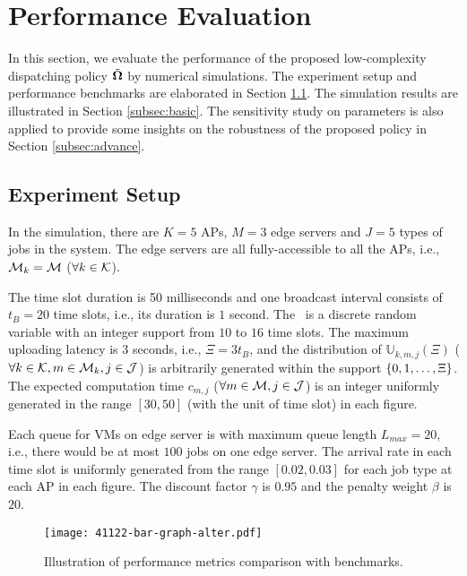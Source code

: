 \section{Performance Evaluation}
\label{sec:evaluation}
In this section, we evaluate the performance of the proposed low-complexity dispatching policy $\tilde{\boldsymbol{\Omega}}$ by numerical simulations.
The experiment setup and performance benchmarks are elaborated in Section \ref{subsec:setup}.
The simulation results are illustrated in Section \ref{subsec:basic}.
The sensitivity study on parameters is also applied to provide some insights on the robustness of the proposed policy in Section \ref{subsec:advance}.

\subsection{Experiment Setup}
\label{subsec:setup}
In the simulation, there are $K=5$ APs, $M=3$ edge servers and $J=5$ types of jobs in the system.
The edge servers are all fully-accessible to all the APs, i.e., $\mathcal{M}_{k}=\mathcal{M}$ ($\forall k\in\mathcal{K}$).

The time slot duration is 50 milliseconds and one broadcast interval consists of $t_{B}=20$ time slots, i.e., its duration is $1$ second.
The \brlatency~is a discrete random variable with an integer support from $10$ to $16$ time slots.
The maximum uploading latency is $3$ seconds, i.e., $\Xi = 3t_B$, and the distribution of $\mathbb{U}_{k,m,j}(\Xi)$ ($\forall k\in\mathcal{K}, m\in\mathcal{M}_{k}, j\in\mathcal{J}$) is arbitrarily generated within the support $\{0, 1, \dots, \Xi\}$.
The expected computation time $c_{m,j}$ ($\forall m\in\mathcal{M}, j\in\mathcal{J}$) is an integer uniformly generated in the range $[30,50]$ (with the unit of time slot) in each figure.

Each queue for VMs on edge server is with maximum queue length $L_{max}=20$, i.e., there would be at most $100$ jobs on one edge server.
The arrival rate in each time slot is uniformly generated from the range $[0.02, 0.03]$ for each job type at each AP in each figure.
The discount factor $\gamma$ is $0.95$ and the penalty weight $\beta$ is $20$.

\begin{figure}[ht]                                                      %
    \centering                                                          %
    \texttt{[image: 41122-bar-graph-alter.pdf]}   %
    \caption{Illustration of performance metrics comparison with benchmarks.}
    \label{fig:bar_plot}                                                %
\end{figure}                                                            %

